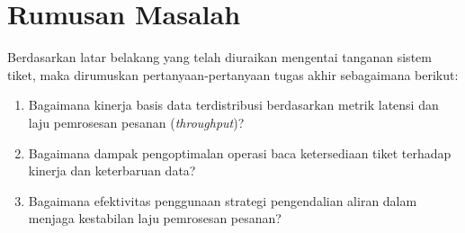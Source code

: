 \section{Rumusan Masalah}
\label{sec:rumusan-masalah}

Berdasarkan latar belakang yang telah diuraikan mengentai tanganan sistem tiket, maka dirumuskan pertanyaan-pertanyaan tugas akhir sebagaimana berikut:

\begin{enumerate}
    \item Bagaimana kinerja basis data terdistribusi berdasarkan metrik latensi dan laju pemrosesan pesanan (\textit{throughput})?
    \item Bagaimana dampak pengoptimalan operasi baca ketersediaan tiket terhadap kinerja dan keterbaruan data?
    \item Bagaimana efektivitas penggunaan strategi pengendalian aliran dalam menjaga kestabilan laju pemrosesan pesanan?
\end{enumerate}
